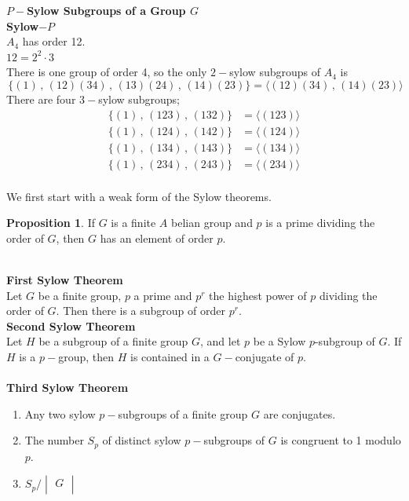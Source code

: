\documentclass[11pt,a4paper]{article}
\theoremstyle{definition}
\newtheorem{prop}[thm]{Proposition}
\begin{document}
\textbf{$P-$Sylow Subgroups of a Group $G$}\\

\textbf{Sylow$-P$}\\
$A_4$ has order 12.\\
$12 = 2^2\cdot 3$\\
There is one group of order 4, so the only $2-$sylow subgroups of $A_4$ is $$\, \{(1)\, , \, (12)(34)\, , \, (13)(24)\, , \, (14)(23)\} = \langle(12)(34)\, , \, (14)(23)\rangle$$
 There are four $3-$sylow subgroups;
\begin{align*}
\{(1)\, , \, (123)\, , \, (132)\} &  = \langle(123)\rangle\\
\{(1)\, , \, (124)\, , \, (142)\} & = \langle(124)\rangle\\
\{(1)\, , \, (134)\, , \, (143)\} & = \langle (134)\rangle\\
\{(1)\, , \, (234)\, , \, (243)\} & = \langle (234)\rangle\\
\end{align*} 
 
 
 
 

We first start with a weak form of the Sylow theorems.\\

\begin{prop}
If $G$ is a finite $A$ belian group and $p$ is a prime dividing the order of $G$, then $G$ has an element of order $p$.\\\\
\end{prop}





\textbf{First Sylow Theorem}\\
Let $G$ be a finite group, $p$ a prime and $p^r$ the highest power of $p$ dividing the order of $G$. Then there is a subgroup of order $p^r$.\\




\textbf{Second Sylow Theorem}\\
Let $H$ be a subgroup of a finite group $G$, and let $p$ be a Sylow $p$-subgroup of $G$. If $H$ is a $p-$group, then $H$ is contained in a $G-$conjugate of $p$.\\\\





\textbf{Third Sylow Theorem}
\begin{enumerate}
\item[(i)] Any two sylow $p-$subgroups of a finite group $G$ are conjugates.
\item[(ii)] The number $S_p$ of distinct sylow $p-$subgroups of $G$ is congruent to 1 modulo $p$.
\item[(iii)] $S_p\big/ \begin{vmatrix}
G\\
\end{vmatrix}$\\
\end{enumerate}
\end{document}
